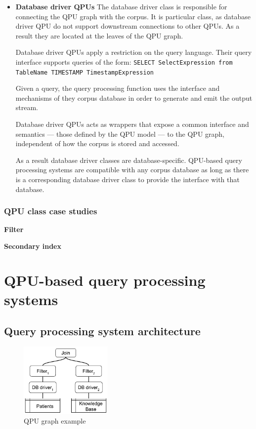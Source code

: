 \begin{itemize}
\begin{itemize}
    \end{itemize}

  \item \textbf{Database driver QPUs}
  The database driver class is responsible for connecting the QPU graph with the corpus.
  It is particular class, as database driver QPU do not support downstream connections to other QPUs.
  As a result they are located at the leaves of the QPU graph.

  Database driver QPUs apply a restriction on the query language.
  Their query interface supports queries of the form:
  {\obeylines\obeyspaces
  \texttt{SELECT SelectExpression from TableName TIMESTAMP TimestampExpression}}

  Given a query, the query processing function uses the interface and mechanisms of they corpus database in order to generate and emit
  the output stream.

  Database driver QPUs acts as wrappers that expose a common interface and semantics --- those defined by the QPU model --- to the
  QPU graph, independent of how the corpus is stored and accessed.

  As a result database driver classes are database-specific.
  QPU-based query processing systems are compatible with any corpus database as long as there is a corresponding database driver class
  to provide the interface with that database.
\end{itemize}

\subsubsection{QPU class case studies}

\textbf{Filter}

\bigskip
\noindent
\textbf{Secondary index}


\section{QPU-based query processing systems}


\subsection{Query processing system architecture}

\begin{figure}[t]
  \centering
    \includegraphics[width=0.4\textwidth]{./figures/design_pattern/qpu_graph_emergent_properties.pdf}
  \caption{QPU graph example}
  \label{fig:qpu_graph_emergent_properties}
\end{figure}

